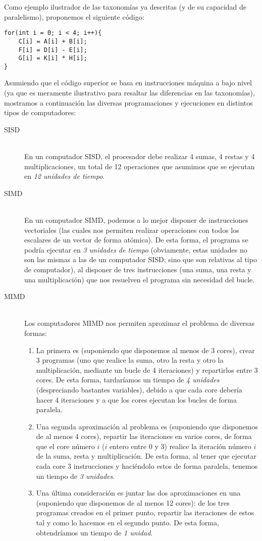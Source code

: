 Como ejemplo ilustrador de las taxonomías ya descritas (y de su capacidad de paralelismo), proponemos el siguiente código:
    \begin{verbatim}
for(int i = 0; i < 4; i++){
    C[i] = A[i] + B[i];
    F[i] = D[i] - E[i];
    G[i] = K[i] * H[i];
}
    \end{verbatim}
Asumiendo que el código superior se basa en instrucciones máquina a bajo nivel (ya que es meramente ilustrativo para resaltar las diferencias en las taxonomías), mostramos a continuación las diversas programaciones y ejecuciones en distintos tipos de computadores:
\begin{description}
    \item [SISD]~\\
        En un computador SISD, el procesador debe realizar 4 sumas, 4 restas y 4 multiplicaciones, un total de 12 operaciones que asumimos que se ejecutan en \emph{12 unidades de tiempo}.
    \item [SIMD]~\\
        En un computador SIMD, podemos a lo mejor disponer de instrucciones vectoriales (las cuales nos permiten realizar operaciones con todos los escalares de un vector de forma atómica). De esta forma, el programa se podría ejecutar en \emph{3 unidades de tiempo} (obviamente, estas unidades no son las mismas a las de un computador SISD; sino que son relativas al tipo de computador), al disponer de tres instrucciones (una suma, una resta y una multiplicación) que nos resuelven el programa sin necesidad del bucle.
    \item [MIMD]~\\
        Los computadores MIMD nos permiten aproximar el problema de diversas formas:
        \begin{enumerate}
            \item La primera es (suponiendo que disponemos al menos de 3 cores), crear 3 programas (uno que realice la suma, otro la resta y otro la multiplicación, mediante un bucle de 4 iteraciones) y repartirlos entre 3 cores. De esta forma, tardaríamos un tiempo de \emph{4 unidades} (despreciando bastantes variables), debido a que cada core debería hacer 4 iteraciones y a que los cores ejecutan los bucles de forma paralela.
            \item Una segunda aproximación al problema es (suponiendo que disponemos de al menos 4 cores), repartir las iteraciones en varios cores, de forma que el core número $i$ ($i$ entero entre 0 y 3) realice la iteración número $i$ de la suma, resta y multiplicación. De esta forma, al tener que ejecutar cada core 3 instrucciones y haciéndolo estos de forma paralela, tenemos un tiempo de \emph{3 unidades}.
            \item Una última consideración es juntar las dos aproximaciones en una (suponiendo que disponemos de al menos 12 cores): de los tres programas creados en el primer punto, repartir las iteraciones de estos tal y como lo hacemos en el segundo punto. De esta forma, obtendríamos un tiempo de \emph{1 unidad}.
        \end{enumerate}

\end{description}
